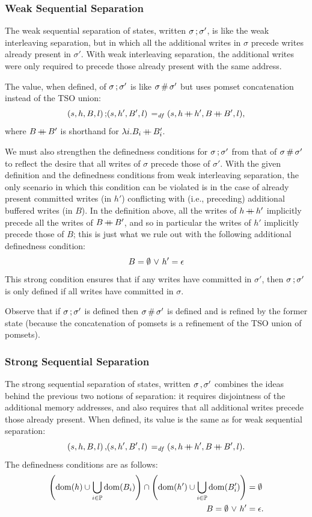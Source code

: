 \documentclass[11pt]{article}
\begin{document}
\subsubsection{Weak Sequential Separation}

The weak sequential separation of states, written $\sigma \operatorname{;} \sigma'$, is like the weak interleaving separation, but in which all the additional writes in $\sigma$ precede writes already present in $\sigma'$. With weak interleaving separation, the additional writes were only required to precede those already present with the same address. 

The value, when defined, of $\sigma \operatorname{;} \sigma'$ is like $\sigma \operatorname{\#} \sigma'$ but uses pomset concatenation instead of the TSO union: \[ (s,h,B,l) \operatorname{;} (s,h',B',l) \operatorname{\;=_{\mathit{df}}\;} (s,h \operatorname{+\!\!\!+} h',B \operatorname{+\!\!\!+} B',l),\] where $B \operatorname{+\!\!\!+} B'$ is shorthand for $\lambda i . B_i \operatorname{+\!\!\!+} B'_i$. 

We must also strengthen the definedness conditions for $\sigma \operatorname{;} \sigma'$ from that of $\sigma \operatorname{\#} \sigma'$ to reflect the desire that all writes of $\sigma$ precede those of $\sigma'$. With the given definition and the definedness conditions from weak interleaving separation, the only scenario in which this condition can be violated is in the case of already present committed writes (in $h'$) conflicting with (i.e., preceding) additional buffered writes (in $B$). In the definition above, all the writes of $h \operatorname{+\!\!\!+} h'$ implicitly precede all the writes of $B \operatorname{+\!\!\!+} B'$, and so in particular the writes of $h'$ implicitly precede those of $B$; this is just what we rule out with the following additional definedness condition: \[ B = \operatorname{\emptyset} \operatorname{\,\vee\,} h' = \epsilon \] This strong condition ensures that if any writes have committed in $\sigma'$, then $\sigma \operatorname{;} \sigma'$ is only defined if all writes have committed in $\sigma$. 

Observe that if $\sigma \operatorname{;} \sigma'$ is defined then $\sigma \operatorname{\#} \sigma'$ is defined and is refined by the former state (because the concatenation of pomsets is a refinement of the TSO union of pomsets). 

\subsubsection{Strong Sequential Separation}

The strong sequential separation of states, written $\sigma \operatorname{,} \sigma'$ combines the ideas behind the previous two notions of separation: it requires disjointness of the additional memory addresses, and also requires that all additional writes precede those already present. When defined, its value is the same as for weak sequential separation: \[ (s,h,B,l) \operatorname{,} (s,h',B',l) \operatorname{\;=_{\mathit{df}}\;} (s,h \operatorname{+\!\!\!+} h', B \operatorname{+\!\!\!+} B',l).\] The definedness conditions are as follows: \begin{align*}
	\left(\operatorname{\mathrm{dom}}(h) \cup \bigcup_{i \in \mathbb{P}} \operatorname{\mathrm{dom}}(B_i) \right) \cap \left( \operatorname{\mathrm{dom}}(h') \cup \bigcup_{i \in \mathbb{P}} \operatorname{\mathrm{dom}}(B'_i)\right) & = \operatorname{\emptyset} \\ 
	B = \operatorname{\emptyset} \operatorname{\,\vee\,} h' & = \epsilon.
\end{align*}
\end{document}
